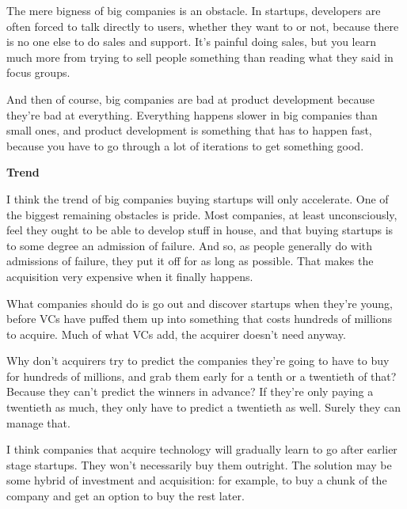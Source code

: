 The
                    mere bigness of big companies is an obstacle. In startups,
                    developers are often forced to talk directly to users,
                    whether they want to or not, because there is no one else to
                    do sales and support. It's painful doing sales, but you
                    learn much more from trying to sell people something than
                    reading what they said in focus groups.

And then
                    of course, big companies are bad at product development
                    because they're bad at everything. Everything happens slower
                    in big companies than small ones, and product development is
                    something that has to happen fast, because you have to go
                    through a lot of iterations to get something good.

\textbf{Trend}

I think the trend of big companies buying
                    startups will only accelerate. One of the biggest remaining
                    obstacles is pride. Most companies, at least unconsciously,
                    feel they ought to be able to develop stuff in house, and
                    that buying startups is to some degree an admission of
                    failure. And so, as people generally do with admissions of
                    failure, they put it off for as long as possible. That makes
                    the acquisition very expensive when it finally happens.

What
                    companies should do is go out and discover startups when
                    they're young, before VCs have puffed them up into something
                    that costs hundreds of millions to acquire. Much of what VCs
                    add, the acquirer doesn't need anyway.

Why don't
                    acquirers try to predict the companies they're going to have
                    to buy for hundreds of millions, and grab them early for a
                    tenth or a twentieth of that? Because they can't predict the
                    winners in advance? If they're only paying a twentieth as
                    much, they only have to predict a twentieth as well. Surely
                    they can manage that.

I think companies that
                    acquire technology will gradually learn to go after earlier
                    stage startups. They won't necessarily buy them outright.
                    The solution may be some hybrid of investment and
                    acquisition: for example, to buy a chunk of the company and
                    get an option to buy the rest later.

